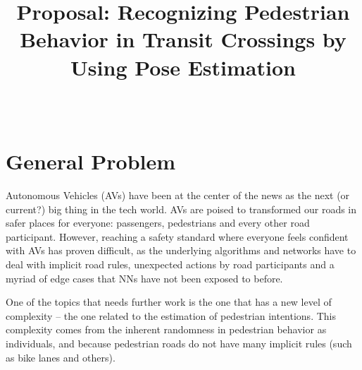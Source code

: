 \documentclass[journal,letterpaper]{IEEEtran}
\begin{document}

\title{Proposal: Recognizing Pedestrian Behavior in Transit Crossings by Using Pose Estimation}

\author{%
  \\
}


\maketitle

%
%

\section{General Problem}\label{sec:general-problem}
Autonomous Vehicles (AVs) have been at the center of the news as the next (or current?) big thing in the tech world. AVs are poised to transformed our roads in safer places for everyone: passengers, pedestrians and every other road participant. However, reaching a safety standard where everyone feels confident with AVs has proven difficult, as the underlying algorithms and networks have to deal with implicit road rules, unexpected actions by road participants and a myriad of edge cases that NNs have not been exposed to before.

One of the topics that needs further work is the one that has a new level of complexity – the one related to the estimation of pedestrian intentions. This complexity comes from the inherent randomness in pedestrian behavior as individuals, and because pedestrian roads do not have many implicit rules (such as bike lanes and others).
\end{document}

